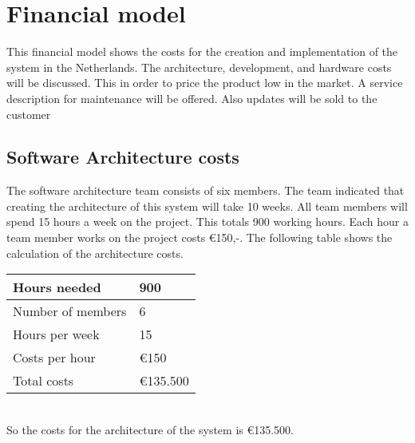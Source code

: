 

\section{Financial model}

This financial model shows the costs for the creation and implementation of the system in the Netherlands. The architecture, development, and hardware costs will be discussed. This in order to price the product low in the market. A service description for maintenance will be offered. Also updates will be sold to the customer\\

\subsection{Software Architecture costs}
The software architecture team consists of six members. The team indicated that creating the architecture of this system will take 10 weeks. All team members will spend 15 hours a week on the project. This totals 900 working hours. Each hour a team member works on the project costs \euro{}150,-. The following table shows the calculation of the architecture costs.

\begin{tabular}{|L{}|L{}|}
	\toprule
	Hours needed & 900 \\ \midrule
	Number of members & 6 \\ \midrule
	Hours per week & 15 \\ \midrule
	Costs per hour & \euro{}150\\ \midrule
	Total costs & \euro{}135.500\\
	\bottomrule
\end{tabular}\\

So the costs for the architecture of the system is \euro{}135.500.

